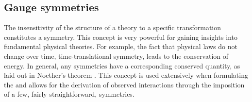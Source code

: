 \subsection{Gauge symmetries}
\label{sec:gaugeSymmetries}

The insensitivity of the structure of a theory to a specific
transformation constitutes a symmetry. This concept is very powerful
for gaining insights into fundamental physical theories. For example,
the fact that physical laws do not change over time,
time-translational symmetry, leads to the conservation of energy.  In
general, any symmetries have a corresponding conserved quantity, as
laid out in Noether's theorem \cite{1971TTSP....1..186N}. This concept
is used extensively when formulating the \SM and allows for the
derivation of observed interactions through the imposition of a few,
fairly straightforward, symmetries.

